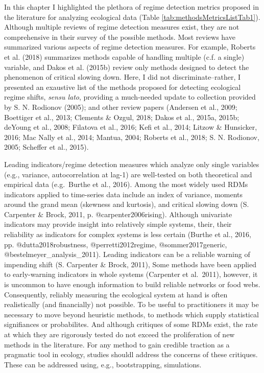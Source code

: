\documentclass[12pt,twoside,openany]{reedthesis}
\begin{document}
In this chapter I highlighted the plethora of regime detection metrics proposed in the literature for analyzing ecological data (Table \ref{tab:methodsMetricsListTab1}). Although multiple reviews of regime detection measures exist, they are not comprehensive in their survey of the possible methods. Most reviews have summarized various aspects of regime detection measures. For example, Roberts et al. (2018) summarizes methods capable of handling multiple (c.f. a single) variable, and Dakos et al. (2015b) review only methods designed to detect the phenomenon of critical slowing down. Here, I did not discriminate--rather, I presented an exaustive list of the methods proposed for detecting ecological regime shifts, \emph{sensu lato}, providing a much-needed update to collection provided by S. N. Rodionov (2005); and other review papers (Andersen et al., 2009; Boettiger et al., 2013; Clements \& Ozgul, 2018; Dakos et al., 2015a, 2015b; deYoung et al., 2008; Filatova et al., 2016; Kefi et al., 2014; Litzow \& Hunsicker, 2016; Mac Nally et al., 2014; Mantua, 2004; Roberts et al., 2018; S. N. Rodionov, 2005; Scheffer et al., 2015).

Leading indicators/regime detection measures which analyze only single variables (e.g., variance, autocorrelation at lag-1) are well-tested on both theoretical and empirical data (e.g.~Burthe et al., 2016). Among the most widely used RDMs indicators applied to time-series data include an index of variance, moments around the grand mean (skewness and kurtosis), and critical slowing down (S. Carpenter \& Brock, 2011, p. @carpenter2006rising). Although univariate indicators may provide insight into relatively simple systems, their, their reliability as indicators for complex systems is less certain (Burthe et al., 2016, pp. @dutta2018robustness, @perretti2012regime, @sommer2017generic, @bestelmeyer\_analysis\_2011). Leading indicators can be a reliable warning of impending shift (S. Carpenter \& Brock, 2011), Some methods have been applied to early-warning indicators in whole systems (Carpenter et al.~2011), however, it is uncommon to have enough information to build reliable networks or food webs. Consequently, reliably measuring the ecological system at hand is often realistically (and financially) not possible. To be useful to practitioners it may be necessary to move beyond heuristic methods, to methods which supply statistical signifiances or probabilites. And although critiques of some RDMs exist, the rate at which they are rigorously tested do not exceed the proliferation of new methods in the literature. For any method to gain credible traction as a pragmatic tool in ecology, studies shouldl address the concerns of these critiques. These can be addressed using, e.g., bootstrapping, simulations.
\end{document}
